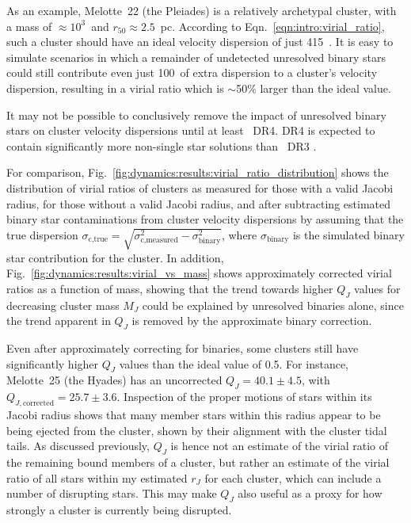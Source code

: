As an example, Melotte~22 (the Pleiades) is a relatively archetypal cluster, with a mass of $\approx10^3$~\MSun and $r_{50}\approx 2.5$~pc. According to Eqn.~\ref{eqn:intro:virial_ratio}, such a cluster should have an ideal velocity dispersion of just 415~\ms. It is easy to simulate scenarios in which a remainder of undetected unresolved binary stars could still contribute even just 100~\ms of extra dispersion to a cluster's velocity dispersion, resulting in a virial ratio which is $\sim$50\% larger than the ideal value.

It may not be possible to conclusively remove the impact of unresolved binary stars on cluster velocity dispersions until at least \gaia\ DR4. DR4 is expected to contain significantly more non-single star solutions than \gaia\ DR3 \citep{gaia_collaboration_gaia_2022}.

For comparison, Fig.~\ref{fig:dynamics:results:virial_ratio_distribution} shows the distribution of virial ratios of clusters as measured for those with a valid Jacobi radius, for those without a valid Jacobi radius, and after subtracting estimated binary star contaminations from cluster velocity dispersions by assuming that the true dispersion $\sigma_\text{c,true}=\sqrt{\sigma_\text{c,measured}^2 - \sigma_\text{binary}^2}$, where $\sigma_\text{binary}$ is the simulated binary star contribution for the cluster. In addition, Fig.~\ref{fig:dynamics:results:virial_vs_mass} shows approximately corrected virial ratios as a function of mass, showing that the trend towards higher $Q_J$ values for decreasing cluster mass $M_J$ could be explained by unresolved binaries alone, since the trend apparent in $Q_J$ is removed by the approximate binary correction.

Even after approximately correcting for binaries, some clusters still have significantly higher $Q_J$ values than the ideal value of 0.5. For instance, Melotte~25 (the Hyades) has an uncorrected $Q_J=40.1\pm4.5$, with $Q_{J,\text{corrected}}=25.7\pm3.6$. Inspection of the proper motions of stars within its Jacobi radius shows that many member stars within this radius appear to be being ejected from the cluster, shown by their alignment with the cluster tidal tails. As discussed previously, $Q_J$ is hence not an estimate of the virial ratio of the remaining bound members of a cluster, but rather an estimate of the virial ratio of all stars within my estimated $r_J$ for each cluster, which can include a number of disrupting stars. This may make $Q_J$ also useful as a proxy for how strongly a cluster is currently being disrupted.   



